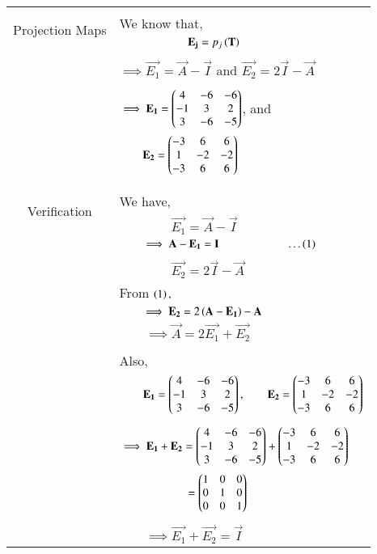 \begin{longtable}{|c|l|}
	&\\
	\hline
	\multirow{3}{*}{Projection Maps} & \\
	& We know that,\\
	&$\qquad \qquad \qquad \mathbf{E_j}=p_j\left(\mathbf{T
	}\right)$\\ 
	&\\
	&$\implies \vec{E_1}=\vec{A}-\vec{I}$ and $\vec{E_2}=2\vec{I}-\vec{A}$ \\
	&\\
	&$\implies \mathbf{E_1}=\begin{pmatrix}4&-6&-6\\-1&3&2\\3&-6&-5\end{pmatrix}$, and \\
	&$\qquad \mathbf{E_2}=\begin{pmatrix}-3&6&6\\1&-2&-2\\-3&6&6\end{pmatrix}$\\
	&\\
	\hline
\multirow{3}{*}{Verification} & \\
	& We have, \\
	&$\qquad\qquad\vec{E_1}=\vec{A}-\vec{I}$\\
	&$\qquad\implies \mathbf{A}-\mathbf{E_1}=\mathbf{I}\qquad\qquad\qquad\dots\left(1\right)$\\
	&\\
	&$\qquad\qquad\vec{E_2}=2\vec{I}-\vec{A}$\\
	&From $\left(1\right),$\\
	&$\qquad\implies\mathbf{E_2}=2\left(\mathbf{A}-\mathbf{E_1}\right)-\mathbf{A}$\\
	&$\qquad\implies \boxed{\vec{A}=2\vec{E_1}+\vec{E_2}}$\\
	&\\
	& Also,\\
	&$\qquad \mathbf{E_1}=\begin{pmatrix}4&-6&-6\\-1&3&2\\3&-6&-5\end{pmatrix},\qquad \mathbf{E_2}=\begin{pmatrix}-3&6&6\\1&-2&-2\\-3&6&6\end{pmatrix}$\\
	&\\
	&$\implies \mathbf{E_1}+\mathbf{E_2}=\begin{pmatrix}4&-6&-6\\-1&3&2\\3&-6&-5\end{pmatrix}+\begin{pmatrix}-3&6&6\\1&-2&-2\\-3&6&6\end{pmatrix}$\\
	&$\qquad\qquad\qquad = \begin{pmatrix}1&0&0\\0&1&0\\0&0&1\end{pmatrix}$\\
	&\\
	&$\qquad\implies\boxed{\vec{E_1}+\vec{E_2}=\vec{I}}$\\

\end{longtable}
